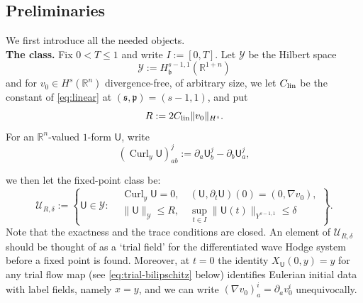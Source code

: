 \documentclass[11pt,reqno]{amsart}
\theoremstyle{plain}
\theoremstyle{definition}
\theoremstyle{remark}
\numberwithin{equation}{section}
\DeclareMathOperator{\Curl}{Curl}
\newcommand{\breg}{\mathfrak b}
\newcommand{\sreg}{\mathfrak s}
\newcommand{\preg}{\mathfrak p}
\newcommand{\Ufield}{\mathsf U}
\newcommand{\Real}{\mathbb R}
\newcommand{\Rn}{\Real^n}
\newcommand{\Rst}{\Real^{1+n}}
\begin{document}
\subsection{Preliminaries} We first introduce all the needed objects.\\

\textbf{The class.} Fix $0<T\le1$ and write $I:=[0,T]$. Let $\mathcal{Y}$ be the Hilbert space
\[
 \mathcal Y:=H^{s-1,1}_{\breg}(\Rst)
\]
and for $v_0\in H^{s}(\Rn)$ divergence-free, of arbitrary size, we let
$C_{\rm lin}$ be the constant of \eqref{eq:linear} at $(\sreg,\preg)=(s-1,1)$, and put
\begin{equation}\label{eq:Rdefn}
    R:=2C_{\rm lin}\|v_0\|_{H^s}.
\end{equation}
For an $\Rn$-valued $1$-form $\Ufield$, write
\begin{equation}\label{eq:Curl}
    (\Curl_{y}\Ufield)^j_{ab}
 :=\partial_a\Ufield_b^j-\partial_b\Ufield_a^j, 
\end{equation}

we then let the fixed-point class be:
\begin{equation}\label{eq:fixedpoint-class}
  \mathcal U_{R,\delta} := \left\{ \Ufield \in \mathcal Y : 
  \begin{aligned}
    &\Curl_{y}\Ufield = 0, \quad (\Ufield,\partial_t\Ufield)(0) = (0,\nabla v_0), \\
    &\|\Ufield\|_{\mathcal Y} \le R, \quad \sup_{t\in I}\|\Ufield(t)\|_{Y^{s-1,1}} \le \delta
  \end{aligned}
  \right\}.
\end{equation}
Note that the exactness and the trace conditions are closed. An element of $\mathcal U_{R,\delta}$ should be thought of as a `trial field' for the differentiated wave Hodge system before a fixed point is found.  Moreover, at $t=0$ the identity $X_\Ufield(0,y)=y$ for any trial flow map (see \eqref{eq:trial-bilipschitz} below) identifies Eulerian initial data with label fields, namely $x=y$, and we can write $(\nabla v_0)_a^i=\partial_av_0^i$ unequivocally.\\
\end{document}
